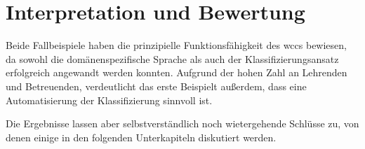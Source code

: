 \section{Interpretation und Bewertung}
    \label{section:findingsInterpretation}
    Beide Fallbeispiele haben die prinzipielle Funktionsfähigkeit des \gls{wccs} bewiesen,
    da sowohl die domänenspezifische Sprache als auch der Klassifizierungsansatz
    erfolgreich angewandt werden konnten.
    Aufgrund der hohen Zahl an Lehrenden und Betreuenden,
    verdeutlicht das erste Beispielt außerdem,
    dass eine Automatisierung der Klassifizierung sinnvoll ist.

    Die Ergebnisse lassen aber selbstverständlich noch wietergehende Schlüsse zu,
    von denen einige in den folgenden Unterkapiteln diskutiert werden.

    
    
    
    
    
